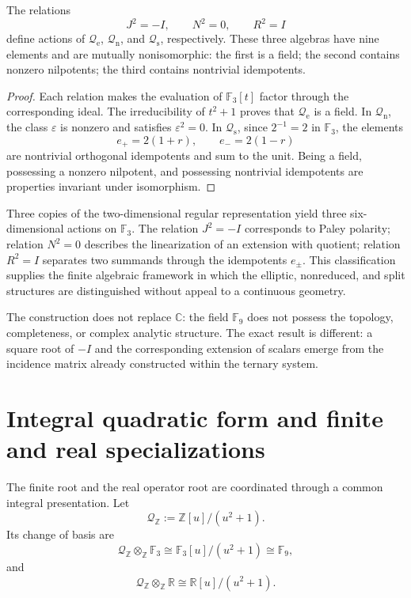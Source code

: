\begin{theorem}
\label{thm:clasificacion-cuadratica-nonadica}
The relations
\[
 J^2=-I,\qquad N^2=0,\qquad R^2=I
\]
define actions of
\(\mathcal Q_{\mathrm e}\), \(\mathcal Q_{\mathrm n}\), and
\(\mathcal Q_{\mathrm s}\), respectively. These three algebras have
nine elements and are mutually nonisomorphic: the first is a field; the
second contains nonzero nilpotents; the third contains nontrivial
idempotents.
\end{theorem}

\begin{proof}
Each relation makes the evaluation of
\(\mathbb F_3[t]\) factor through the corresponding ideal. The irreducibility of
\(t^2+1\) proves that \(\mathcal Q_{\mathrm e}\) is a field. In
\(\mathcal Q_{\mathrm n}\), the class \(\varepsilon\) is nonzero and satisfies
\(\varepsilon^2=0\). In \(\mathcal Q_{\mathrm s}\), since \(2^{-1}=2\) in
\(\mathbb F_3\), the elements
\[
 e_+=2(1+r),\qquad e_-=2(1-r)
\]
are nontrivial orthogonal idempotents and sum to the unit. Being a field,
possessing a nonzero nilpotent, and possessing nontrivial idempotents are
properties invariant under isomorphism.
\end{proof}

Three copies of the two-dimensional regular representation yield
three six-dimensional actions on \(\mathbb F_3\). The relation
\(J^2=-I\) corresponds to Paley polarity; relation \(N^2=0\)
describes the linearization of an extension with quotient; relation
\(R^2=I\) separates two summands through the idempotents \(e_\pm\). This
classification supplies the finite algebraic framework in which the
elliptic, nonreduced, and split structures are distinguished without appeal to a
continuous geometry.

The construction does not replace \(\mathbb C\): the field \(\mathbb F_9\) does not
possess the topology, completeness, or complex analytic structure. The
exact result is different: a square root of \(-I\) and the corresponding
extension of scalars emerge from the incidence matrix already constructed
within the ternary system.

\section{Integral quadratic form and finite and real specializations}
\label{sec:fuente-cuadratica-integral-rev3}

The finite root and the real operator root are coordinated through a common integral presentation. Let
\begin{equation}
 \mathcal Q_{\mathbb Z}
 :=\mathbb Z[u]/(u^2+1).
 \label{eq:fuente-cuadratica-integral-rev3}
\end{equation}
Its change of basis are
\[
 \mathcal Q_{\mathbb Z}\otimes_{\mathbb Z}\mathbb F_3
 \cong\mathbb F_3[u]/(u^2+1)
 \cong\mathbb F_9,
\]
and
\[
 \mathcal Q_{\mathbb Z}\otimes_{\mathbb Z}\mathbb R
 \cong\mathbb R[u]/(u^2+1).
\]

